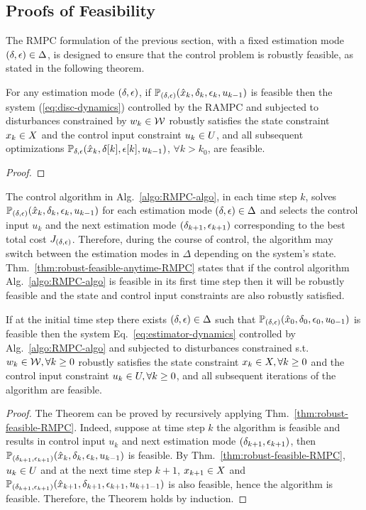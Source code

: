 \subsection{Proofs of Feasibility}
The RMPC formulation of the previous section, with a fixed estimation mode
$\left(\delta,\epsilon\right)\in\Delta$, is designed to ensure that the control problem is robustly feasible, as stated in the following theorem.
\begin{thm}
\label{thm:robust-feasible-RMPC} For
any estimation mode $\left(\delta,\epsilon\right)$, if $\mathbb{P}_{(\delta,\epsilon)}(\hat{x}_{k},\delta_{k},\epsilon_{k},u_{k -1})$
is feasible then the system (\ref{eq:disc-dynamics}) controlled by
the RAMPC and subjected to disturbances constrained by $w_k \in \mathcal{W}$
robustly satisfies the state constraint $x_k \in X$
and the control input constraint $u_k \in U$, and
all subsequent optimizations $\mathbb{P_{\delta,\epsilon}}(\hat{x}_{k},\delta[k],\epsilon[k],u_{k-1})$,
$\forall k>k_{0}$, are feasible.
\end{thm}
\begin{proof}

\end{proof}
The control algorithm in Alg.~\ref{algo:RMPC-algo}, in each time step $k$, solves $\mathbb{P}_{(\delta,\epsilon)}(\hat{x}_{k},\delta_{k},\epsilon_{k},u_{k -1})$ for each estimation mode $(\delta,\epsilon) \in\Delta$ and selects the control input $u_{k}$ and the next estimation mode $(\delta_{k+1},\epsilon_{k+1})$
corresponding to the best total cost $J_{(\delta,\epsilon)}$.
Therefore, during the course of control, the algorithm may switch between the estimation modes in $\Delta$ depending on the system's state. Thm.~\ref{thm:robust-feasible-anytime-RMPC} states that if the control algorithm Alg.~\ref{algo:RMPC-algo} is feasible in its first time step then it will be robustly feasible and the state and control input constraints are also robustly satisfied.
\begin{thm}%
\label{thm:robust-feasible-anytime-RMPC}
If at the initial time step there exists $\left(\delta,\epsilon\right)\in\Delta$
such that $\mathbb{P}_{(\delta,\epsilon)}(\hat{x}_{0},\delta_{0},\epsilon_{0},u_{0 -1})$
is feasible then the system Eq.~\ref{eq:estimator-dynamics} controlled by
Alg.~\ref{algo:RMPC-algo} and subjected to disturbances constrained
s.t. $w_k\in \mathcal{W},\forall k\geq0$ robustly satisfies the state constraint
$x_k\in X,\forall k\geq0$ and the control input constraint $u_k\in U,\forall k\geq0$,
and all subsequent iterations of the algorithm are feasible.
\end{thm}
\begin{proof}
The Theorem can be proved by recursively applying Thm.~\ref{thm:robust-feasible-RMPC}.
Indeed, suppose at time step $k$ the algorithm
is feasible and results in control input $u_{k}$ and next estimation
mode $(\delta_{k+1},\epsilon_{k+1})$, then $\mathbb{P}_{(\delta_{k+1},\epsilon_{k+1})}(\hat{x}_{k},\delta_{k},\epsilon_{k},u_{k -1})$
is feasible. By Thm.~\ref{thm:robust-feasible-RMPC}, $u_{k}\in U$ and
at the next time step $k+1$, $x_{k+1}\in X$ and $\mathbb{P}_{(\delta_{k+1},\epsilon_{k+1})}(\hat{x}_{k+1},\delta_{k+1},\epsilon_{k+1},u_{k+1 -1})$
is also feasible, hence the algorithm is feasible.
Therefore, the Theorem holds by induction.
\end{proof}



